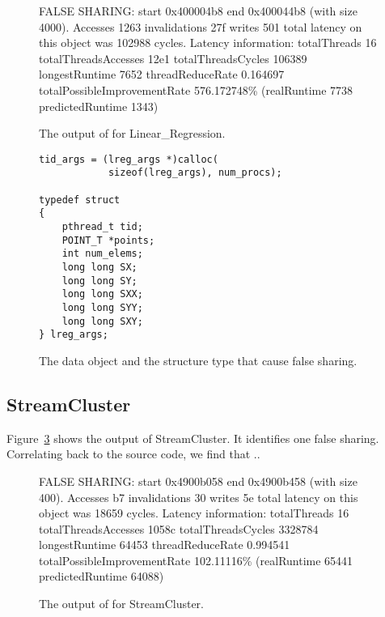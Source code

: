 \begin{figure}
\begin{minipage}{\columnwidth}

\centering

\fbox
{
\begin{minipage}{3in}
FALSE SHARING: start 0x400004b8 end 0x400044b8 (with size 4000). Accesses 1263 invalidations 27f writes 501 total latency on this object was 102988 cycles.
Latency information: totalThreads 16 totalThreadsAccesses 12e1 totalThreadsCycles 106389 longestRuntime 7652 threadReduceRate 0.164697 totalPossibleImprovementRate 576.172748\% (realRuntime 7738 predictedRuntime 1343)
\end{minipage}
}
\vspace{1em}
\caption{The output of \cheetah{} for Linear\_Regression.}
\label{fig:lr}
\end{minipage}
\end{figure}


\begin{figure}
\begin{verbatim}
tid_args = (lreg_args *)calloc(
	        sizeof(lreg_args), num_procs);

typedef struct
{
    pthread_t tid;
    POINT_T *points;
    int num_elems;
    long long SX;
    long long SY;
    long long SXX;
    long long SYY;
    long long SXY;
} lreg_args;	    
\end{verbatim}
\caption{The data object and the structure type that cause false sharing.}
\label{lr:code}
\end{figure}

\subsection{StreamCluster}

Figure~\ref{fig:sc} shows the output of StreamCluster. It identifies one false sharing. Correlating back to the source code, we find that ..

\begin{figure}
\begin{minipage}{\columnwidth}

\centering

\fbox
{
\begin{minipage}{3in}
FALSE SHARING: start 0x4900b058 end 0x4900b458 (with size 400). Accesses b7 invalidations 30 writes 5e total latency on this object was 18659 cycles.
Latency information: totalThreads 16 totalThreadsAccesses 1058c totalThreadsCycles 3328784 longestRuntime 64453 threadReduceRate 0.994541 totalPossibleImprovementRate 102.11116\% (realRuntime 65441 predictedRuntime 64088)
\end{minipage}
}
\vspace{1em}
\caption{The output of \cheetah{} for StreamCluster.}
\label{fig:sc}
\end{minipage}
\end{figure}


